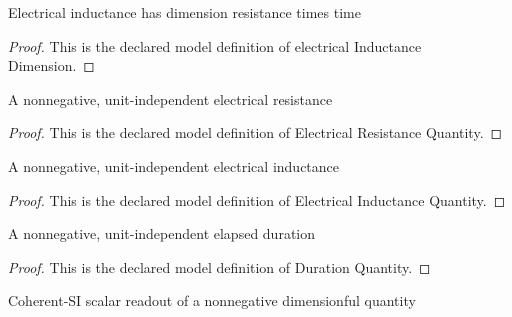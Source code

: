\begin{definition}
  \label{def:physics:phyx-mini-0928:phyxminiproblems-problemphyxmini0928-electricalinductancedimension}
  Electrical inductance has dimension resistance times time
\end{definition}
\begin{proof}
  This is the declared model definition of electrical Inductance Dimension.
\end{proof}
\begin{definition}
  \label{def:physics:phyx-mini-0928:phyxminiproblems-problemphyxmini0928-electricalresistancequantity}
  A nonnegative, unit-independent electrical resistance
\end{definition}
\begin{proof}
  This is the declared model definition of Electrical Resistance Quantity.
\end{proof}
\begin{definition}
  \label{def:physics:phyx-mini-0928:phyxminiproblems-problemphyxmini0928-electricalinductancequantity}
  A nonnegative, unit-independent electrical inductance
\end{definition}
\begin{proof}
  This is the declared model definition of Electrical Inductance Quantity.
\end{proof}
\begin{definition}
  \label{def:physics:phyx-mini-0928:phyxminiproblems-problemphyxmini0928-durationquantity}
  A nonnegative, unit-independent elapsed duration
\end{definition}
\begin{proof}
  This is the declared model definition of Duration Quantity.
\end{proof}
\begin{definition}
  \label{def:physics:phyx-mini-0928:phyxminiproblems-problemphyxmini0928-coherentsireadout}
  Coherent-SI scalar readout of a nonnegative dimensionful quantity
\end{definition}
